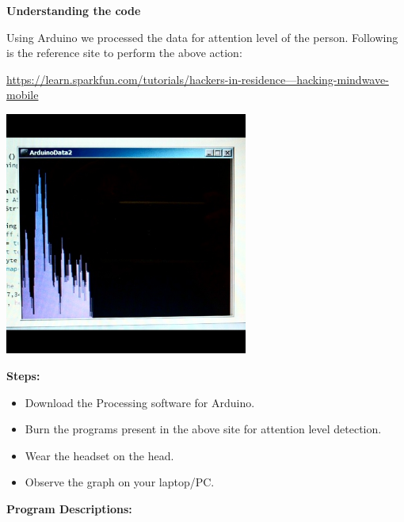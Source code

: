 \documentclass[12pt]{article}
\author{Omkar Mohite}
\title{}
\begin{document}
\begin{center}
\textbf{{\LARGE Understanding the code}}
\end{center}

{\raggedright
Using Arduino we processed the data for attention level of the person. Following
is the reference site to perform the above action:
}

{\raggedright
\href{https://learn.sparkfun.com/tutorials/hackers-in-residence---hacking-mindwave-mobile}{https://learn.sparkfun.com/tutorials/hackers-in-residence---hacking-mindwave-mobile}
}
\begin{center}
	\graphicspath{ {images/} }
	\includegraphics[width=8cm, height=8cm]{Arduino}
\end{center}
\textbf{{\large Steps:}}

\begin{itemize}
	\item Download the Processing software for Arduino.
	\item Burn the programs present in the above site for attention level detection.
	\item Wear the headset on the head.
	\item Observe the graph on your laptop/PC.
\end{itemize}

\break

{\raggedright
\textbf{{\large Program Descriptions:}}
}
\end{document}
